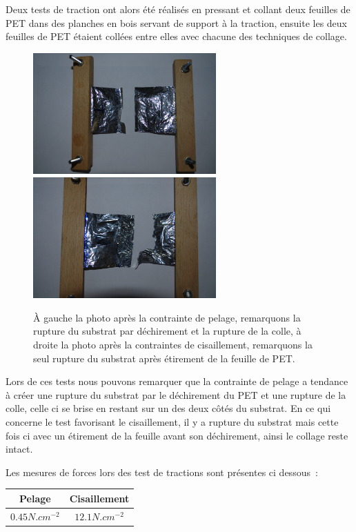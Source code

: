\documentclass[a4paper,11pt]{article}
\begin{document}
Deux tests de traction ont alors été réalisés en pressant et collant deux feuilles de PET dans des planches en bois servant de support à la traction, ensuite les deux feuilles de PET étaient collées entre elles avec chacune des techniques de collage.

\begin{figure}[H]
	\centering
 \includegraphics[width=7cm]{../Images/test_pelage.png}
 \includegraphics[width=7cm]{../Images/test_cisaillement.png}
 \caption{À gauche la photo après la contrainte de pelage, remarquons la rupture du substrat par déchirement et la rupture de la colle, à droite la photo après la contraintes de cisaillement, remarquons la seul rupture du substrat après étirement de la feuille de PET.}
\end{figure}

Lors de ces tests nous pouvons remarquer que la contrainte de pelage a tendance à créer une rupture du substrat par le déchirement du PET et une rupture de la colle, celle ci se brise en restant sur un des deux côtés du substrat.
En ce qui concerne le test favorisant le cisaillement, il y a rupture du substrat mais cette fois ci avec un étirement de la feuille avant son déchirement, ainsi le collage reste intact.

Les mesures de forces lors des test de tractions sont présentes ci dessous~:

\begin{center}
  \begin{tabular}{|c|c|}
    \hline
    Pelage & Cisaillement \\
    \hline
    $0.45 N.cm^{-2}$ & $12.1 N.cm^{-2}$ \\
    \hline
  \end{tabular}
\end{center}
\end{document}
